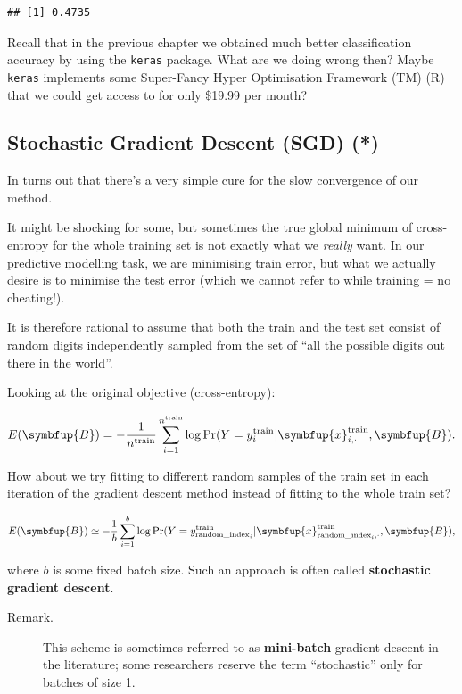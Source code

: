 \documentclass[10pt,b5paper,krantz1]{krantz}
\renewcommand{\mathbf}[1]{\symbfup{#1}}
\begin{document}
\begin{verbatim}
## [1] 0.4735
\end{verbatim}

Recall that in the previous chapter
we obtained much better classification accuracy by using the \texttt{keras} package.
What are we doing wrong then? Maybe \texttt{keras} implements some Super-Fancy
Hyper Optimisation Framework (TM) (R) that we could get access to for
only \$19.99 per month?

\hypertarget{stochastic-gradient-descent-sgd}{%
\subsection{Stochastic Gradient Descent (SGD) (*)}\label{stochastic-gradient-descent-sgd}}

In turns out that there's a very simple cure for the slow convergence of our
method.

It might be shocking for some, but sometimes the true global minimum
of cross-entropy for the whole training set
is not exactly what we \emph{really} want.
In our predictive modelling task, we are minimising train error,
but what we actually desire is to minimise the test error
(which we cannot refer to while training = no cheating!).

It is therefore rational to assume that both the train and the test set
consist of random digits independently sampled from the set of ``all the possible
digits out there in the world''.

Looking at the original objective (cross-entropy):

\[
E(\mathbf{B}) =
-\frac{1}{n^\text{train}} \sum_{i=1}^{n^\text{train}}
\log \Pr(Y=y_i^\text{train}|\mathbf{x}_{i,\cdot}^\text{train},\mathbf{B}).
\]

How about we try fitting to different random samples of the train set
in each iteration of the gradient descent method
instead of fitting to the whole train set?

\[
E(\mathbf{B}) \simeq
-\frac{1}{b} \sum_{i=1}^b
\log \Pr(Y=y_{\text{random\_index}_i}^\text{train}|\mathbf{x}_{\text{random\_index}_i,\cdot}^\text{train},\mathbf{B}),
\]

where \(b\) is some fixed batch size.
Such an approach is often called \textbf{stochastic gradient descent}.

\begin{description}
\item[Remark.]
This scheme is sometimes referred to as \textbf{mini-batch} gradient descent
in the literature; some researchers reserve the term ``stochastic''
only for batches of size 1.
\end{description}
\end{document}
